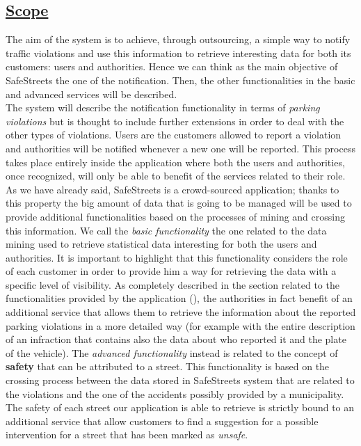 \subsection[Scope]{\hyperlink{toc}{Scope}}
	The aim of the system is to achieve, through outsourcing, a simple way to notify traffic violations and use this information to retrieve interesting data for both its customers: users and authorities. Hence we can think as the main objective of SafeStreets the one of the notification. Then, the other functionalities in the basic and advanced services will be described.\\
	
	The system will describe the notification functionality in terms of \emph{parking violations} but is thought to include further extensions in order to deal with the other types of violations. Users are the customers allowed to report a violation and authorities will be notified whenever a new one will be reported. This process takes place entirely inside the application where both the users and authorities, once recognized, will only be able to benefit of the services related to their role. As we have already said, SafeStreets is a crowd-sourced application; thanks to this property the big amount of data that is going to be managed will be used to provide additional functionalities based on the processes of mining and crossing this information. We call the \emph{basic functionality} the one related to the data mining used to retrieve statistical data interesting for both the users and authorities. It is important to highlight that this functionality considers the role of each customer in order to provide him a way for retrieving the data with a specific level of visibility. As completely described in the section related to the functionalities provided by the application (), the authorities in fact benefit of an additional service that allows them to retrieve the information about the reported parking violations in a more detailed way (for example with the entire description of an infraction that contains also the data about who reported it and the plate of the vehicle). The \emph{advanced functionality} instead is related to the concept of \textbf{safety} that can be attributed to a street. This functionality is based on the crossing process between the data stored in SafeStreets system that are related to the violations and the one of the accidents possibly provided by a municipality. The safety of each street our application is able to retrieve is strictly bound to an additional service that allow customers to find a suggestion for a possible intervention for a street that has been marked as \emph{unsafe}.\\
	
